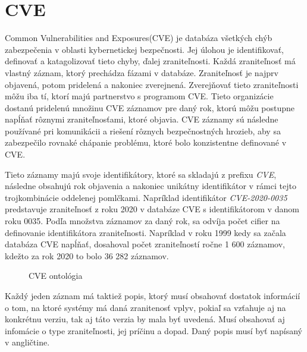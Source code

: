 \documentclass[12pt, a4paper, oneside]{book}
\begin{document}
\section{CVE}
Common Vulnerabilities and Exposures(CVE) je databáza všetkých chýb zabezpečenia v oblasti kybernetickej bezpečnosti. Jej úlohou je identifikovať, definovať a katagolizovať tieto chyby, ďalej zraniteľnosti. Každá zraniteľnosť má vlastný záznam, ktorý prechádza fázami v databáze. Zraniteľnosť je najprv objavená, potom pridelená a nakoniec zverejnená. Zverejňovať tieto zraniteľnosti môžu iba tí, ktorí majú partnerstvo s programom CVE. Tieto organizácie dostanú pridelenú množinu CVE záznamov pre daný rok, ktorú môžu postupne napĺňať rôznymi zraniteľnosťami, ktoré objavia. CVE záznamy sú následne používané pri komunikácii a riešení rôznych bezpečnostných hrozieb, aby sa zabezpečilo rovnaké chápanie problému, ktoré bolo konzistentne definované v CVE.  


Tieto záznamy majú svoje identifikátory, ktoré sa skladajú z prefixu \textit{CVE}, následne obsahujú rok objavenia a nakoniec unikátny identifikátor v rámci tejto trojkombinácie oddelenej pomlčkami. Napríklad identifikátor \textit{CVE-2020-0035} predstavuje  zraniteľnosť z roku 2020 v databáze CVE s identifikátorom v danom roku 0035. Podľa množstva záznamov za daný rok, sa odvíja počet cifier na definovanie identifikátora zraniteľnosti. Napríklad v roku 1999 kedy sa začala databáza CVE napĺňať, dosahoval počet zraniteľností ročne 1 600 záznamov, kdežto za rok 2020 to bolo 36 282 záznamov.


\begin{figure}[!hb]
\label{fig:cveOnto}
\caption{CVE ontológia}
\end{figure}


Každý jeden záznam má taktiež popis, ktorý musí obsahovať dostatok informácií o tom, na ktoré systémy má daná zranitenosť vplyv, pokiaľ sa vzťahuje aj na konkrétnu verziu, tak aj táto verzia by mala byť uvedená. Musí obsahovať aj infomácie o type zraniteľnosti, jej príčinu a dopad. Daný popis musí byť napísaný v angličtine.
\end{document}
